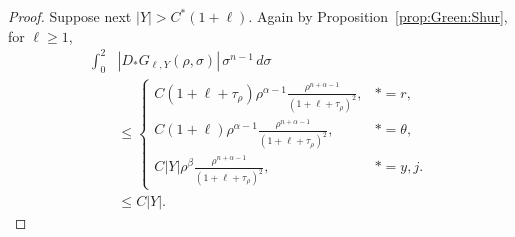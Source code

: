 \documentclass[12pt]{amsart}
\begin{document}
\begin{proof}
Suppose next $|Y|>C^*(1+\ell)$. Again by Proposition~\ref{prop:Green:Shur}, for $\ell \ge 1$,
\begin{align*}
    \int_0^2 &|D_* G_{\ell,Y}(\rho,\sigma)| \, \sigma^{n-1} \, d\sigma \\
    &\le  \begin{cases}
        C (1+\ell+\tau_\rho) \rho^{\alpha-1} \frac{\rho^{n+\alpha-1}}{(1+\ell+\tau_\rho)^2}, & *=r,\\
    C (1+\ell) \rho^{\alpha-1} \frac{\rho^{n+\alpha-1}}{(1+\ell+\tau_\rho)^2}, & *=\theta,\\
    C|Y|\rho^\beta
    \frac{\rho^{n+\alpha-1}}{(1+\ell+\tau_\rho)^2}, & *=y,j.
    \end{cases}\\
    &\le C|Y|.
\end{align*}


\end{proof}
\end{document}
